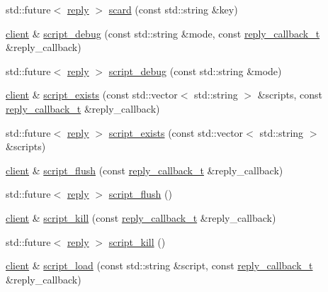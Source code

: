 \begin{DoxyCompactItemize}
\item 
std\+::future$<$ \hyperlink{classcpp__redis_1_1reply}{reply} $>$ \hyperlink{classcpp__redis_1_1client_a089148ca908f563e7b73649aac3bd01e}{scard} (const std\+::string \&key)
\item 
\hyperlink{classcpp__redis_1_1client}{client} \& \hyperlink{classcpp__redis_1_1client_a6e83ee14e50aef360d7246c2da63b037}{script\+\_\+debug} (const std\+::string \&mode, const \hyperlink{classcpp__redis_1_1client_a061a1140d36d2eaeda82b09a0bb3f9f2}{reply\+\_\+callback\+\_\+t} \&reply\+\_\+callback)
\item 
std\+::future$<$ \hyperlink{classcpp__redis_1_1reply}{reply} $>$ \hyperlink{classcpp__redis_1_1client_a336d8dd0da70700d67bac5e71484efff}{script\+\_\+debug} (const std\+::string \&mode)
\item 
\hyperlink{classcpp__redis_1_1client}{client} \& \hyperlink{classcpp__redis_1_1client_a6fcb8af437a9ae919af745cd0a0fa313}{script\+\_\+exists} (const std\+::vector$<$ std\+::string $>$ \&scripts, const \hyperlink{classcpp__redis_1_1client_a061a1140d36d2eaeda82b09a0bb3f9f2}{reply\+\_\+callback\+\_\+t} \&reply\+\_\+callback)
\item 
std\+::future$<$ \hyperlink{classcpp__redis_1_1reply}{reply} $>$ \hyperlink{classcpp__redis_1_1client_ab55eac91086b7746d731c8405f901016}{script\+\_\+exists} (const std\+::vector$<$ std\+::string $>$ \&scripts)
\item 
\hyperlink{classcpp__redis_1_1client}{client} \& \hyperlink{classcpp__redis_1_1client_a6d885c8b61bfbb74245be8d040813637}{script\+\_\+flush} (const \hyperlink{classcpp__redis_1_1client_a061a1140d36d2eaeda82b09a0bb3f9f2}{reply\+\_\+callback\+\_\+t} \&reply\+\_\+callback)
\item 
std\+::future$<$ \hyperlink{classcpp__redis_1_1reply}{reply} $>$ \hyperlink{classcpp__redis_1_1client_a44f5707f8487285d69737b7857c436d7}{script\+\_\+flush} ()
\item 
\hyperlink{classcpp__redis_1_1client}{client} \& \hyperlink{classcpp__redis_1_1client_a65abffc1a1669931d5b6715f354b59af}{script\+\_\+kill} (const \hyperlink{classcpp__redis_1_1client_a061a1140d36d2eaeda82b09a0bb3f9f2}{reply\+\_\+callback\+\_\+t} \&reply\+\_\+callback)
\item 
std\+::future$<$ \hyperlink{classcpp__redis_1_1reply}{reply} $>$ \hyperlink{classcpp__redis_1_1client_a35286249f2405afa0cf412472c1067b4}{script\+\_\+kill} ()
\item 
\hyperlink{classcpp__redis_1_1client}{client} \& \hyperlink{classcpp__redis_1_1client_a1c1d1b3daff14dc29c32d1ea8407efdb}{script\+\_\+load} (const std\+::string \&script, const \hyperlink{classcpp__redis_1_1client_a061a1140d36d2eaeda82b09a0bb3f9f2}{reply\+\_\+callback\+\_\+t} \&reply\+\_\+callback)

\end{DoxyCompactItemize}
